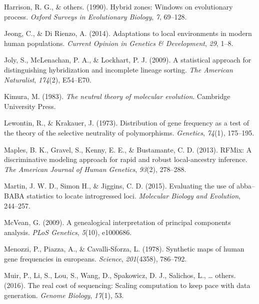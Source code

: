 \documentclass[12pt,twoside]{reedthesis}
\begin{document}
  \hypertarget{ref-harrison1990hybrid}{}
  Harrison, R. G., \& others. (1990). Hybrid zones: Windows on
  evolutionary process. \emph{Oxford Surveys in Evolutionary Biology},
  \emph{7}, 69--128.
  
  \hypertarget{ref-jeong2014adaptations}{}
  Jeong, C., \& Di Rienzo, A. (2014). Adaptations to local environments in
  modern human populations. \emph{Current Opinion in Genetics \&
  Development}, \emph{29}, 1--8.
  
  \hypertarget{ref-joly2009statistical}{}
  Joly, S., McLenachan, P. A., \& Lockhart, P. J. (2009). A statistical
  approach for distinguishing hybridization and incomplete lineage
  sorting. \emph{The American Naturalist}, \emph{174}(2), E54--E70.
  
  \hypertarget{ref-kimura1983neutral}{}
  Kimura, M. (1983). \emph{The neutral theory of molecular evolution}.
  Cambridge University Press.
  
  \hypertarget{ref-lewontin1973distribution}{}
  Lewontin, R., \& Krakauer, J. (1973). Distribution of gene frequency as
  a test of the theory of the selective neutrality of polymorphisms.
  \emph{Genetics}, \emph{74}(1), 175--195.
  
  \hypertarget{ref-maples2013rfmix}{}
  Maples, B. K., Gravel, S., Kenny, E. E., \& Bustamante, C. D. (2013).
  RFMix: A discriminative modeling approach for rapid and robust
  local-ancestry inference. \emph{The American Journal of Human Genetics},
  \emph{93}(2), 278--288.
  
  \hypertarget{ref-martin2000}{}
  Martin, J. W. D., Simon H., \& Jiggins, C. D. (2015). Evaluating the use
  of abba--BABA statistics to locate introgressed loci. \emph{Molecular
  Biology and Evolution}, 244--257.
  
  \hypertarget{ref-mcvean2009genealogical}{}
  McVean, G. (2009). A genealogical interpretation of principal components
  analysis. \emph{PLoS Genetics}, \emph{5}(10), e1000686.
  
  \hypertarget{ref-menozzi1978synthetic}{}
  Menozzi, P., Piazza, A., \& Cavalli-Sforza, L. (1978). Synthetic maps of
  human gene frequencies in europeans. \emph{Science}, \emph{201}(4358),
  786--792.
  
  \hypertarget{ref-muir2016real}{}
  Muir, P., Li, S., Lou, S., Wang, D., Spakowicz, D. J., Salichos, L.,
  \ldots{} others. (2016). The real cost of sequencing: Scaling
  computation to keep pace with data generation. \emph{Genome Biology},
  \emph{17}(1), 53.
  
\end{document}
